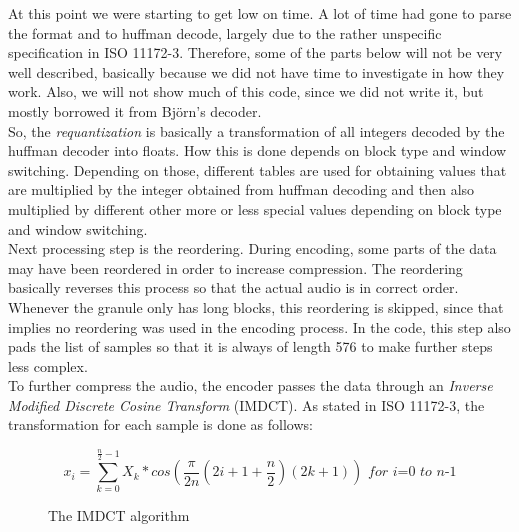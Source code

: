 \documentclass[a4paper,12pt]{article}
\begin{document}
        At this point we were starting to get low on time. A lot of time had
        gone to parse the format and to huffman decode, largely due to the
        rather unspecific specification in ISO 11172-3. Therefore, some of the
        parts below will not be very well described, basically because we did
        not have time to investigate in how they work. Also, we will not show
        much of this code, since we did not write it, but mostly borrowed it
        from Björn's decoder. \\

        So, the \textit{requantization} is basically a transformation of all
        integers decoded by the huffman decoder into floats. How this is done
        depends on block type and window switching. Depending on those,
        different tables are used for obtaining values that are multiplied by
        the integer obtained from huffman decoding and then also multiplied by
        different other more or less special values depending on block type and
        window switching. \\

        Next processing step is the reordering. During encoding, some parts of
        the data may have been reordered in order to increase compression. The
        reordering basically reverses this process so that the actual audio is
        in correct order. Whenever the granule only has long blocks, this
        reordering is skipped, since that implies no reordering was used in the
        encoding process. In the code, this step also pads the list of samples
        so that it is always of length 576 to make further steps less complex.
        \\

        To further compress the audio, the encoder passes the data through an
        \textit{Inverse Modified Discrete Cosine Transform} (IMDCT). As stated
        in ISO 11172-3, the transformation for each sample is done as
        follows:
\begin{figure}[H]
  \begin{center}
        \[
            x_i = \sum_{k=0}^{\frac{n}{2} - 1}{X_k * cos(\frac{\pi}{2n}(2i + 1 +
                  \frac{n}{2})(2k + 1))}
            \textit{ for i=0 to n-1}
        \]
    \caption{The IMDCT algorithm}\label{fig:imdctalgo}
  \end{center}
\end{figure}
\end{document}

